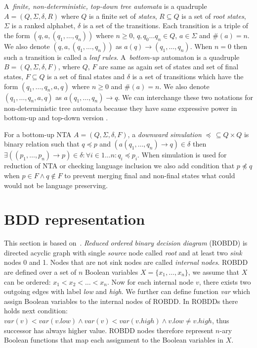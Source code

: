 \documentclass[a4paper, 12pt]{article}
\begin{document}
A~\emph{finite, non-deterministic, top-down tree automata} is a quadruple $A=(Q, \Sigma, \delta, R)$ where
$Q$ is a finite set of \emph{states}, $R\subseteq Q$ is a set of \emph{root states}, $\Sigma$ is a ranked alphabet,
$\delta$ is a set of the transitions.
Each transition is a triple of the form $(q,a,(q_1, \ldots, q_n))$ where $n \geq 0$, $q, q_0 \ldots q_n \in Q$, $a \in \Sigma$ and $\#(a) = n$.
We also denote $(q,a,(q_1, \ldots, q_n))$ as $a(q) \rightarrow (q_1, \ldots, q_n)$.
When $n = 0$ then such a transition is called a \emph{leaf rules}.
A~\emph{bottom-up} automaton is a quadruple $B=(Q, \Sigma, \delta, F)$, where $Q$, $F$ are same as again set of states and set of final states, $F\subseteq Q$
is a set of final states and $\delta$ is a set of transitions which have the form $(q_1,\ldots, q_n,a,q)$ where $n \geq 0$ and $\#(a) = n$.
We also denote $(q_1,\ldots, q_n,a,q)$ as $a(q_1, \ldots, q_n) \rightarrow q$.
We can interchange these two notations for non-deterministic tree automata because they have same expressive power in bottom-up and top-down version \cite{tata}.

For a bottom-up NTA $A=(Q, \Sigma, \delta, F)$, a \emph{downward simulation} $\preceq\, \subseteq Q\times Q$ is binary relation such that $q \preceq p$
and $(a(q_1,\ldots, q_n) \rightarrow q) \in \delta$ then $\exists ((p_1, \ldots, p_n) \rightarrow p) \in \delta: \forall i \in {1 \ldots n}: q_i \preceq p_i$.
When simulation is used for reduction of NTA or checking language inclusion we also add condition that $p \not\preceq q$ when $p \in F \wedge q \notin F$
to prevent merging final and non-final states what could would not be language preserving.

\section{BDD representation}
\label{sec:bdd}

This section is based on~\cite{fiedor:wsks}. \textit{Reduced ordered binary decision diagram} (ROBDD) is directed acyclic graph with single \textit{source} node called \textit{root} and at least two \textit{sink} nodes 0 and 1. Nodes that are not sink nodes are called \textit{internal nodes}. ROBDD are defined over a set of $n$ Boolean variables $X = \{x_1, \dots, x_n\}$, we assume that $X$ can be ordered: $x_1 < x_2 < \dots < x_n$. Now for each internal node $v$, there exists two outgoing edges with label \textit{low} and \textit{high}. We further can define function \textit{var} which assign Boolean variables to the internal nodes of ROBDD. In ROBDDs there holds next condition: $var(v) < var(v.low) \wedge var(v) < var(v.high) \wedge v.low \neq v.high$, thus successor has always higher value. ROBDD nodes therefore represent $n$-ary Boolean functions that map each assignment to the Boolean variables in $X$.
\end{document}
